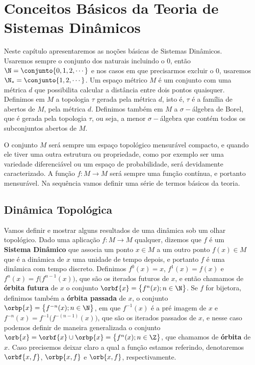 

\chapter{Conceitos Básicos da Teoria de Sistemas Dinâmicos} 

Neste capítulo apresentaremos as noções básicas de Sistemas Dinâmicos. Usaremos sempre o conjunto dos naturais incluindo o $0$, então $\N=\conjunto{0,1,2,\cdots}$ e nos casos em que precisarmos excluir o $0$, usaremos $\N_{*}=\conjunto{1,2,\cdots}$. Um espaço métrico $M$ é um conjunto com uma métrica $d$ que possibilita calcular a distância entre dois pontos quaisquer. Definimos em $M$ a topologia $\tau$ gerada pela métrica $d$, isto é, $\tau$ é a família de abertos de $M$, pela métrica $d$. Definimos também em $M$ a $\sigma-$álgebra de Borel, que é gerada pela topologia $\tau$, ou seja, a menor $\sigma-$álgebra que contém todos os subconjuntos abertos de $M$. 

O conjunto $M$ será sempre um espaço topológico mensurável compacto, e quando ele tiver uma outra estrutura ou propriedade, como por exemplo ser uma variedade diferenciável ou um espaço de probabilidade, será devidamente caracterizado. A função $f:M\to M$ será sempre uma função contínua, e portanto mensurável. Na sequência vamos definir uma série de termos básicos da teoria.

\section{Dinâmica Topológica}

Vamos definir e mostrar alguns resultados de uma dinâmica sob um olhar topológico. Dado uma aplicação $f:M\to M$ qualquer, dizemos que $f$ é um \textbf{Sistema Dinâmico} que associa um ponto $x\in M$ a um outro ponto $f(x)\in M$ que é a dinâmica de $x$ uma unidade de tempo depois, e portanto $f$ é uma dinâmica com tempo discreto. Definimos $f^{0}(x)=x$, $f^1(x)=f(x)$ e $f^{n}(x)=f\big(f^{n-1}(x)\big)$, que são os iterados futuros de $x$, e então chamamos de \textbf{órbita futura} de $x$ o conjunto $\orbf{x}=\big\{f^n(x);n\in\N\big\}$. Se $f$ for bijetora, definimos também a \textbf{órbita passada} de $x$, o conjunto $\orbp{x}=\big\{f^{-n}(x);n\in\N\big\}$, em que $f^{-1}(x)$ é a pré imagem de $x$ e $f^{-n}(x)=f^{-1}\big(f^{-(n-1)}(x)\big)$, que são os iterados passados de $x$, e nesse caso podemos definir de maneira generalizada o conjunto $\orb{x}=\orbf{x}\cup\orbp{x}=\big\{f^{n}(x);n\in\Z\big\}$, que chamamos de \textbf{órbita} de $x$. Caso precisemos deixar claro a qual a função estamos referindo, denotaremos $\orbf{x,f}$, $\orbp{x,f}$ e $\orb{x,f}$, respectivamente.

